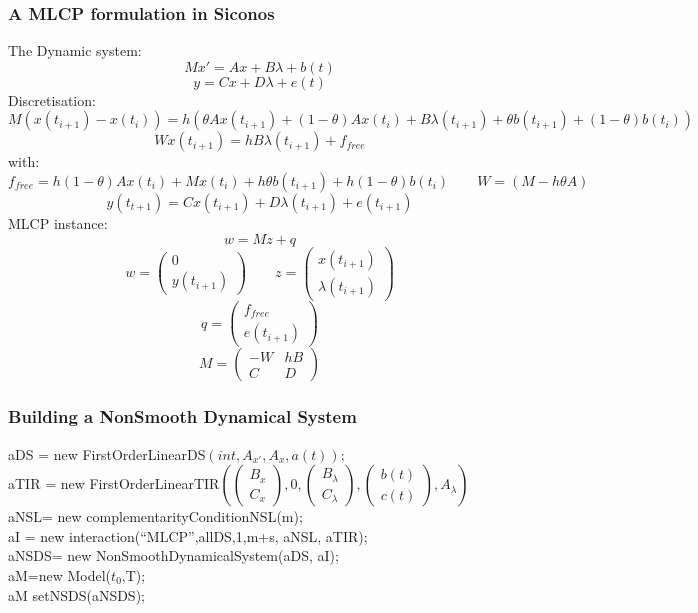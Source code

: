 \subsubsection{A MLCP formulation in Siconos}
The Dynamic system:
\[Mx'=Ax +B \lambda +b(t)\]
\[y=Cx +D \lambda +e(t)\]
Discretisation:
\[M(x(t_{i+1})-x(t_{i}))=h(\theta A x(t_{i+1}) + (1-\theta) A x(t_{i}) +B \lambda (t_{i+1}) +\theta
b(t_{i+1}) + (1-\theta) b(t_{i}))\]
\[Wx(t_{i+1})=hB \lambda (t_{i+1}) + f_{free}\]
with:
\[f_{free}=h(1-\theta) A x(t_{i}) + Mx(t_{i})+h \theta b(t_{i+1}) + h(1-\theta) b(t_{i}) \qquad W=(M-h\theta A)\]
\[y(t_{t+1})=Cx(t_{i+1}) +D \lambda(t_{i+1}) +e(t_{i+1})\]
MLCP instance:
\[w=Mz+q\]
\[w=\left(\begin{array}{c}0\\y(t_{i+1})\end{array}\right) \qquad
z=\left(\begin{array}{c}x(t_{i+1})\\ \lambda (t_{i+1})\end{array}\right)\]
\[q=\left(\begin{array}{c}f_{free}\\ e(t_{i+1})\end{array}\right)\]
\[M=\left(\begin{array}{cc}-W&hB\\ C&D\end{array}\right)\]
\newpage
\subsubsection{Building a NonSmooth Dynamical System}
 
 aDS = new FirstOrderLinearDS$(int,A_{x'},A_{x},a(t))$;\\
 aTIR = new FirstOrderLinearTIR$(\left(\begin{array}{c}B_{x}\\C_{x}
 \end{array}\right),0,\left(\begin{array}{c}B_{\lambda}\\C_{\lambda}
 \end{array}\right),\left(\begin{array}{c}b(t)\\c(t) \end{array}\right),A_{\lambda})$\\

 aNSL= new complementarityConditionNSL(m);\\
 aI = new interaction(``MLCP'',allDS,1,m+s, aNSL, aTIR);\\
 aNSDS= new NonSmoothDynamicalSystem(aDS, aI);\\
 aM=new Model($t_{0}$,T);\\
 aM setNSDS(aNSDS);\\
\\
